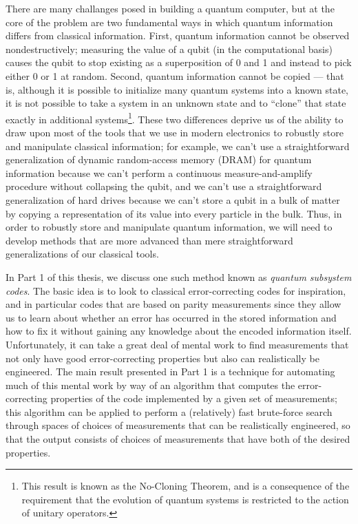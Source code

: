 \documentclass[12pt]{amsbook}
\theoremstyle{plain}
\theoremstyle{definition}
\theoremstyle{remark}
\begin{document}
There are many challanges posed in building a quantum computer, but at the core of the problem are two fundamental ways in which quantum information differs from classical information.  First, quantum information cannot be observed nondestructively;  measuring the value of a qubit (in the computational basis) causes the qubit to stop existing as a superposition of 0 and 1 and instead to pick either 0 or 1 at random.  Second, quantum information cannot be copied --- that is, although it is possible to initialize many quantum systems into a known state, it is not possible to take a system in an unknown state and to ``clone'' that state exactly in additional systems\footnote{This result is known as the No-Cloning Theorem, and is a consequence of the requirement that the evolution of quantum systems is restricted to the action of unitary operators\cite{Wootters1982}.}.  These two differences deprive us of the ability to draw upon most of the tools that we use in modern electronics to robustly store and manipulate classical information;  for example, we can't use a straightforward generalization of dynamic random-access memory (DRAM) for quantum information because we can't perform a continuous measure-and-amplify procedure without collapsing the qubit, and we can't use a straightforward generalization of hard drives because we can't store a qubit in a bulk of matter by copying a representation of its value into every particle in the bulk.  Thus, in order to robustly store and manipulate quantum information, we will need to develop methods that are more advanced than mere straightforward generalizations of our classical tools.

In Part 1 of this thesis, we discuss one such method known as \emph{quantum subsystem codes}.  The basic idea is to look to classical error-correcting codes for inspiration, and in particular codes that are based on parity measurements since they allow us to learn about whether an error has occurred in the stored information and how to fix it without gaining any knowledge about the encoded information itself.  Unfortunately, it can take a great deal of mental work to find measurements that not only have good error-correcting properties but also can realistically be engineered.  The main result presented in Part 1 is a technique for automating much of this mental work by way of an algorithm that computes the error-correcting properties of the code implemented by a given set of measurements;  this algorithm can be applied to perform a (relatively) fast brute-force search through spaces of choices of measurements that can be realistically engineered, so that the output consists of choices of measurements that have both of the desired properties.
\end{document}
